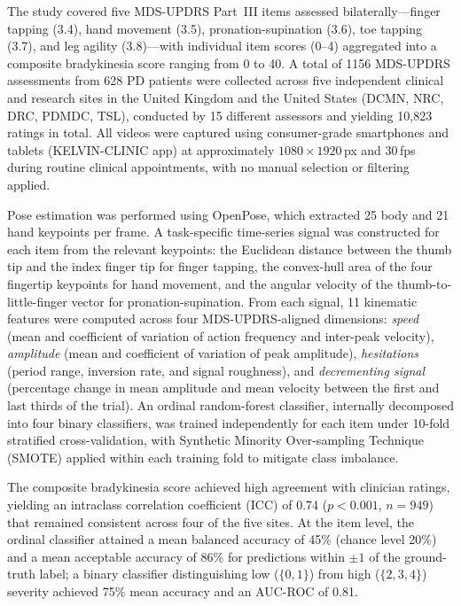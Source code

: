 The study covered five MDS-UPDRS Part~III items assessed bilaterally---finger tapping (3.4), hand movement (3.5), pronation-supination (3.6), toe tapping (3.7), and leg agility (3.8)---with individual item scores (0--4) aggregated into a composite bradykinesia score ranging from 0 to 40. A total of 1156 MDS-UPDRS assessments from 628 PD patients were collected across five independent clinical and research sites in the United Kingdom and the United States (DCMN, NRC, DRC, PDMDC, TSL), conducted by 15 different assessors and yielding 10{,}823 ratings in total. All videos were captured using consumer-grade smartphones and tablets (KELVIN-CLINIC\texttrademark{} app) at approximately $1080\times1920$\,px and 30\,fps during routine clinical appointments, with no manual selection or filtering applied.

Pose estimation was performed using OpenPose, which extracted 25 body and 21 hand keypoints per frame. A task-specific time-series signal was constructed for each item from the relevant keypoints: the Euclidean distance between the thumb tip and the index finger tip for finger tapping, the convex-hull area of the four fingertip keypoints for hand movement, and the angular velocity of the thumb-to-little-finger vector for pronation-supination. From each signal, 11 kinematic features were computed across four MDS-UPDRS-aligned dimensions: \emph{speed} (mean and coefficient of variation of action frequency and inter-peak velocity), \emph{amplitude} (mean and coefficient of variation of peak amplitude), \emph{hesitations} (period range, inversion rate, and signal roughness), and \emph{decrementing signal} (percentage change in mean amplitude and mean velocity between the first and last thirds of the trial). An ordinal random-forest classifier, internally decomposed into four binary classifiers, was trained independently for each item under 10-fold stratified cross-validation, with Synthetic Minority Over-sampling Technique (SMOTE) applied within each training fold to mitigate class imbalance.

The composite bradykinesia score achieved high agreement with clinician ratings, yielding an intraclass correlation coefficient (ICC) of 0.74 ($p < 0.001$, $n = 949$) that remained consistent across four of the five sites. At the item level, the ordinal classifier attained a mean balanced accuracy of 45\% (chance level 20\%) and a mean acceptable accuracy of 86\% for predictions within $\pm 1$ of the ground-truth label; a binary classifier distinguishing low ($\{0,1\}$) from high ($\{2,3,4\}$) severity achieved 75\% mean accuracy and an AUC-ROC of 0.81.

